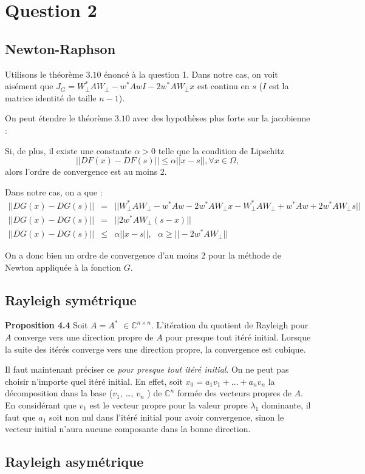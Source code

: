 \section*{Question 2}

\subsection*{Newton-Raphson}

Utilisons le théorème $3.10$ énoncé à la question 1.
Dans notre cas, on voit aisément que $J_G = W_{\perp}^{*} A W_{\perp}- w^{*} A w I - 2 w^{*} A W_{\perp} x$ est continu en $s$ ($I$ est la matrice identité de taille $n-1$).

On peut étendre le théorème $3.10$ avec des hypothèses plus forte sur la jacobienne : 

Si, de plus, il existe une constante $\alpha > 0$ telle que la condition de Lipschitz 
$$||DF(x) - DF(s)|| \leq \alpha || x - s||, \forall x \in \Omega,$$
alors l'ordre de convergence est au moins 2. 

Dans notre cas, on a que : 
\begin{eqnarray}
||DG(x) - DG(s)|| &=& ||W_{\perp}^{*} A W_{\perp}- w^{*} A w - 2 w^{*} A W_{\perp} x - W_{\perp}^{*} A W_{\perp}+ w^{*} A w + 2 w^{*} A W_{\perp} s || \\
||DG(x) - DG(s)|| &=&  ||2 w^{*} A W_{\perp} (s-x) || \\
 ||DG(x) - DG(s)|| &\leq & \alpha || x - s||, \text{	} \alpha \geq || - 2 w^{*} A W_{\perp} ||
\end{eqnarray}

On a donc bien un ordre de convergence d'au moins 2 pour la méthode de Newton appliquée à la fonction $G$.

\subsection*{Rayleigh symétrique}

\textbf{Proposition 4.4} Soit $A = A^*$ $ \in \mathbb{C}^{n\times n}$. L'itération du quotient de Rayleigh pour $A$ converge vers une direction propre de $A$ pour presque tout itéré initial. Lorsque la suite des itérés converge vers une direction propre, la convergence est cubique. 

Il faut maintenant préciser ce \textit{pour presque tout itéré initial}. On ne peut pas choisir n'importe quel itéré initial. En effet, soit $x_0 = a_1 v_1 + \ldots + a_n v_n $ la décomposition dans la base ($v_1$, \ldots , $v_n$ ) de $\mathbb{C}^n$ formée des vecteurs propres de $A$. En considérant que $v_1$ est le vecteur propre pour la valeur propre $\lambda_1$ dominante, il faut que $a_1$ soit non nul dans l'itéré initial pour avoir convergence, sinon le vecteur initial n'aura aucune composante dans la bonne direction.   

\subsection*{Rayleigh asymétrique}